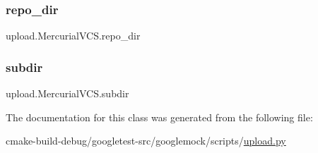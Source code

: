 \subsubsection{\texorpdfstring{repo\_dir}{repo\_dir}}
{\footnotesize\ttfamily upload.\+Mercurial\+V\+C\+S.\+repo\+\_\+dir}

\mbox{\label{classupload_1_1MercurialVCS_a0dad32e621f5523e3430d867184f0b42}} 
\subsubsection{\texorpdfstring{subdir}{subdir}}
{\footnotesize\ttfamily upload.\+Mercurial\+V\+C\+S.\+subdir}



The documentation for this class was generated from the following file\+:\begin{DoxyCompactItemize}
\item 
cmake-\/build-\/debug/googletest-\/src/googlemock/scripts/\mbox{\hyperlink{googlemock_2scripts_2upload_8py}{upload.\+py}}\end{DoxyCompactItemize}
